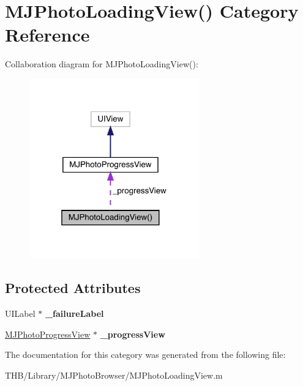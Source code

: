 \hypertarget{category_m_j_photo_loading_view_07_08}{}\section{M\+J\+Photo\+Loading\+View() Category Reference}
\label{category_m_j_photo_loading_view_07_08}


Collaboration diagram for M\+J\+Photo\+Loading\+View()\+:\nopagebreak
\begin{figure}[H]
\begin{center}
\leavevmode
\includegraphics[width=208pt]{category_m_j_photo_loading_view_07_08__coll__graph}
\end{center}
\end{figure}
\subsection*{Protected Attributes}
\begin{DoxyCompactItemize}
\item 
\mbox{\label{category_m_j_photo_loading_view_07_08_aaa3e1ff11fbddb5b4fdf6823cd4f55e5}} 
U\+I\+Label $\ast$ {\bfseries \+\_\+failure\+Label}
\item 
\mbox{\label{category_m_j_photo_loading_view_07_08_a155c9b2837a296338f3f20555d5f6359}} 
\mbox{\hyperlink{interface_m_j_photo_progress_view}{M\+J\+Photo\+Progress\+View}} $\ast$ {\bfseries \+\_\+progress\+View}
\end{DoxyCompactItemize}


The documentation for this category was generated from the following file\+:\begin{DoxyCompactItemize}
\item 
T\+H\+B/\+Library/\+M\+J\+Photo\+Browser/M\+J\+Photo\+Loading\+View.\+m\end{DoxyCompactItemize}
